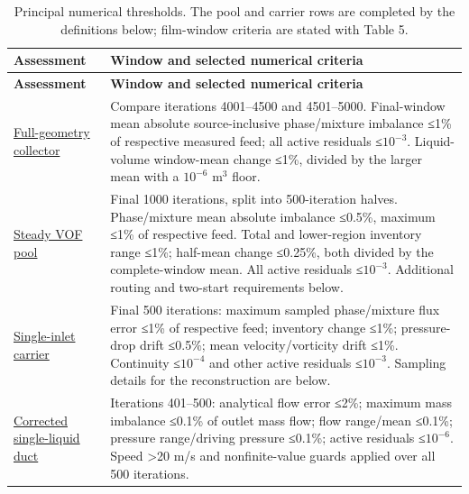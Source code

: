\begin{longtable}{@{}>{\raggedright\arraybackslash}p{0.29000000\dimexpr\linewidth-2\tabcolsep\relax}>{\raggedright\arraybackslash}p{0.71000000\dimexpr\linewidth-2\tabcolsep\relax}@{}}
\caption{Principal numerical thresholds. The pool and carrier rows are completed by the definitions below; film-window criteria are stated with Table 5.}\label{tab:table-B.2}\\
\toprule
\textbf{Assessment} & \textbf{Window and selected numerical criteria} \\
\midrule
\endfirsthead
\toprule
\textbf{Assessment} & \textbf{Window and selected numerical criteria} \\
\midrule
\endhead
\href{../../../../experiments/phase-07b-full-geometry-liquid-removal/s040-collector/setup.md}{Full-geometry collector} & Compare iterations 4001--4500 and 4501--5000. Final-window mean absolute source-inclusive phase/mixture imbalance ≤1\% of respective measured feed; all active residuals ≤\(10^{-3}\). Liquid-volume window-mean change ≤1\%, divided by the larger mean with a \(10^{-6}\) m\(^3\) floor. \\
\href{../../../../experiments/phase-09-steady-vof-pool/setup.md}{Steady VOF pool} & Final 1000 iterations, split into 500-iteration halves. Phase/mixture mean absolute imbalance ≤0.5\%, maximum ≤1\% of respective feed. Total and lower-region inventory range ≤1\%; half-mean change ≤0.25\%, both divided by the complete-window mean. All active residuals ≤\(10^{-3}\). Additional routing and two-start requirements below. \\
\href{../../../../experiments/phase-10-single-inlet-mesh-convergence/setup.md}{Single-inlet carrier} & Final 500 iterations: maximum sampled phase/mixture flux error ≤1\% of respective feed; inventory change ≤1\%; pressure-drop drift ≤0.5\%; mean velocity/vorticity drift ≤1\%. Continuity ≤\(10^{-4}\) and other active residuals ≤\(10^{-3}\). Sampling details for the reconstruction are below. \\
\href{../../../../experiments/phase-09-steady-vof-pool/follow-on-diagnostics/drainage-boundary-verification/setup.md}{Corrected single-liquid duct} & Iterations 401--500: analytical flow error ≤2\%; maximum mass imbalance ≤0.1\% of outlet mass flow; flow range/mean ≤0.1\%; pressure range/driving pressure ≤0.1\%; active residuals ≤\(10^{-6}\). Speed \textgreater20 m/s and nonfinite-value guards applied over all 500 iterations. \\
\bottomrule
\end{longtable}

